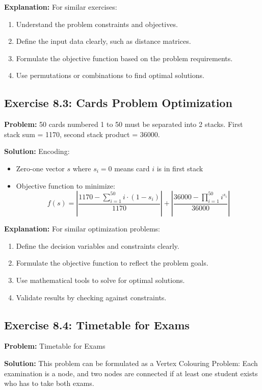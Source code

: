 \textbf{Explanation:}
For similar exercises:
\begin{enumerate}
\item Understand the problem constraints and objectives.
\item Define the input data clearly, such as distance matrices.
\item Formulate the objective function based on the problem requirements.
\item Use permutations or combinations to find optimal solutions.
\end{enumerate}

\subsection{Exercise 8.3: Cards Problem Optimization}
\textbf{Problem:} 50 cards numbered 1 to 50 must be separated into 2 stacks. First stack sum = 1170, second stack product = 36000.

\textbf{Solution:}
Encoding:
\begin{itemize}
\item Zero-one vector $s$ where $s_i = 0$ means card $i$ is in first stack
\item Objective function to minimize:
\[ f(s) = \left|\frac{1170 - \sum_{i=1}^{50} i \cdot (1-s_i)}{1170}\right| + \left|\frac{36000 - \prod_{i=1}^{50} i^{s_i}}{36000}\right| \]
\end{itemize}

\textbf{Explanation:}
For similar optimization problems:
\begin{enumerate}
\item Define the decision variables and constraints clearly.
\item Formulate the objective function to reflect the problem goals.
\item Use mathematical tools to solve for optimal solutions.
\item Validate results by checking against constraints.
\end{enumerate}

\subsection{Exercise 8.4: Timetable for Exams}
\textbf{Problem:} Timetable for Exams

\textbf{Solution:}
This problem can be formulated as a Vertex Colouring Problem: Each examination is a node, and two nodes are connected if at least one student exists who has to take both exams.

